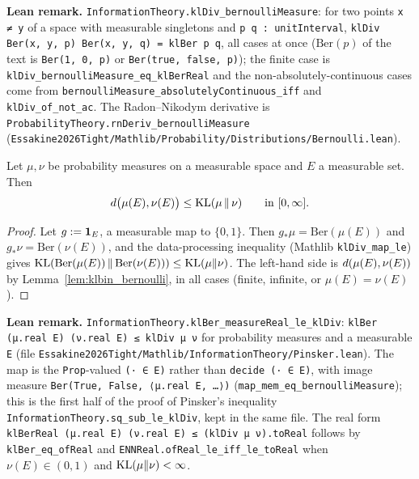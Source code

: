 \textbf{Lean remark.} \texttt{InformationTheory.klDiv\_bernoulliMeasure}: for two points
\texttt{x ≠ y} of a space with measurable singletons and \texttt{p q : unitInterval},
\texttt{klDiv Ber(x, y, p) Ber(x, y, q) = klBer p q}, all cases at once ($\mathrm{Ber}(p)$ of the
text is \texttt{Ber(1, 0, p)} or \texttt{Ber(true, false, p)}); the finite case is
\texttt{klDiv\_bernoulliMeasure\_eq\_klBerReal} and the non-absolutely-continuous cases come from
\texttt{bernoulliMeasure\_absolutelyContinuous\_iff} and \texttt{klDiv\_of\_not\_ac}. The
Radon--Nikodym derivative is \texttt{ProbabilityTheory.rnDeriv\_bernoulliMeasure}
(\texttt{Essakine2026Tight/Mathlib/Probability/Distributions/Bernoulli.lean}).

\begin{lemma}\label{lem:klbin_le_kl}
\leanok
{}
Let $\mu, \nu$ be probability measures on a measurable space and $E$ a measurable set. Then
\[
  d\big(\mu(E), \nu(E)\big) \le \mathrm{KL}(\mu \,\|\, \nu) \qquad\text{in } [0, \infty].
\]
\end{lemma}

\begin{proof}
\leanok
Let $g := \mathbf{1}_E$, a measurable map to $\{0, 1\}$. Then $g_*\mu = \mathrm{Ber}(\mu(E))$ and
$g_*\nu = \mathrm{Ber}(\nu(E))$, and the data-processing inequality (Mathlib
\texttt{klDiv\_map\_le}) gives $\mathrm{KL}(\mathrm{Ber}(\mu(E))\,\|\,\mathrm{Ber}(\nu(E))) \le \mathrm{KL}(\mu\|\nu)$.
The left-hand side is $d(\mu(E), \nu(E))$ by Lemma~\ref{lem:klbin_bernoulli}, in all cases
(finite, infinite, or $\mu(E) = \nu(E)$).
\end{proof}

\textbf{Lean remark.} \texttt{InformationTheory.klBer\_measureReal\_le\_klDiv}:
\texttt{klBer (μ.real E) (ν.real E) ≤ klDiv μ ν} for probability measures and a measurable
\texttt{E} (file \texttt{Essakine2026Tight/Mathlib/InformationTheory/Pinsker.lean}). The map is
the \texttt{Prop}-valued \texttt{(· ∈ E)} rather than \texttt{decide (· ∈ E)}, with image measure
\texttt{Ber(True, False, ⟨μ.real E, …⟩)} (\texttt{map\_mem\_eq\_bernoulliMeasure}); this is the first
half of the proof of Pinsker's inequality \texttt{InformationTheory.sq\_sub\_le\_klDiv}, kept in
the same file. The real form \texttt{klBerReal (μ.real E) (ν.real E) ≤ (klDiv μ ν).toReal} follows
by \texttt{klBer\_eq\_ofReal} and \texttt{ENNReal.ofReal\_le\_iff\_le\_toReal} when
$\nu(E) \in (0,1)$ and $\mathrm{KL}(\mu\|\nu) < \infty$.

